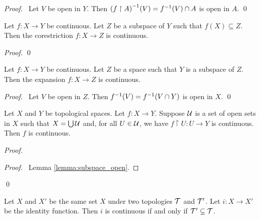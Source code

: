 \begin{proof}
    \pf\ Let $V$ be open in $Y$. Then ${(f \restriction A)}^{-1}(V) = {f}^{-1}(V) \cap A$ is open in $A$. \qed
\end{proof}

\begin{theorem}
    Let $f : X \rightarrow Y$ be continuous. Let $Z$ be a subspace of $Y$ such that $f(X) \subseteq Z$. Then
    the corestriction $f : X \rightarrow Z$ is continuous.
\end{theorem}

\begin{proof}
    \pf
    \qed
\end{proof}

\begin{theorem}
    Let $f : X \rightarrow Y$ be continuous. Let $Z$ be a space such that $Y$ is a subspace of $Z$.
    Then the expansion $f : X \rightarrow Z$ is continuous.
\end{theorem}

\begin{proof}
    \pf\ Let $V$ be open in $Z$. Then ${f}^{-1}(V) = {f}^{-1}(V \cap Y)$ is open in $X$. \qed
\end{proof}

\begin{theorem}
    Let $X$ and $Y$ be topological spaces. Let $f : X \rightarrow Y$. Suppose $\mathcal{U}$ is a set of open sets
    in $X$ such that $X = \bigcup \mathcal{U}$ and, for all $U \in \mathcal{U}$, we have $f \restriction U : U \rightarrow Y$
    is continuous. Then $f$ is continuous.
\end{theorem}

\begin{proof}
    \pf
    \begin{proof}
        \pf\ Lemma \ref{lemma:subspace_open}.
    \end{proof}
    \qed
\end{proof}

\begin{proposition}
    Let $X$ and $X'$ be the same set $X$ under two topologies $\mathcal{T}$ and $\mathcal{T}'$. Let $i : X \rightarrow X'$
    be the identity function. Then $i$ is continuous if and only if $\mathcal{T}' \subseteq \mathcal{T}$.
\end{proposition}

